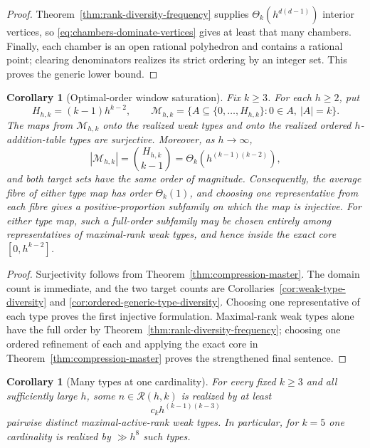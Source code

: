 \documentclass[11pt,reqno]{amsart}
\newtheorem{corollary}[theorem]{Corollary}
\theoremstyle{definition}
\theoremstyle{remark}
\newcommand{\Rcal}{\mathcal R}
\begin{document}
\begin{proof}
Theorem~\ref{thm:rank-diversity-frequency} supplies
$\Theta_k(h^{d(d-1)})$ interior vertices, so
\eqref{eq:chambers-dominate-vertices} gives at least that many chambers.
Finally, each chamber is an open rational polyhedron and contains a
rational point; clearing denominators realizes its strict ordering by an
integer set. This proves the generic lower bound.
\end{proof}

\begin{corollary}[Optimal-order window saturation]
\label{cor:critical-window-saturation}
Fix $k\geq3$.  For each $h\geq2$, put
\[
 H_{h,k}=(k-1)h^{k-2},\qquad
 \mathcal M_{h,k}
 =\{A\subseteq\{0,\ldots,H_{h,k}\}:0\in A,\ |A|=k\}.
\]
The maps from $\mathcal M_{h,k}$ onto the realized weak types and onto the
realized ordered $h$-addition-table types are surjective.  Moreover, as
$h\to\infty$,
\[
 |\mathcal M_{h,k}|=\binom{H_{h,k}}{k-1}
 =\Theta_k\!\left(h^{(k-1)(k-2)}\right),
\]
and both target sets have the same order of magnitude.  Consequently, the
average fibre of either type map has order $\Theta_k(1)$, and choosing one
representative from each fibre gives a positive-proportion subfamily on which
the map is injective.  For either type map, such a full-order subfamily may
be chosen entirely among representatives of maximal-rank weak types, and
hence inside the exact core $[0,h^{k-2}]$.
\end{corollary}

\begin{proof}
Surjectivity follows from Theorem~\ref{thm:compression-master}.  The domain
count is immediate, and the two target counts are
Corollaries~\ref{cor:weak-type-diversity} and
\ref{cor:ordered-generic-type-diversity}.  Choosing one representative of
each type proves the first injective formulation.  Maximal-rank weak types
alone have the full order by Theorem~\ref{thm:rank-diversity-frequency};
choosing one ordered refinement of each and applying the exact core in
Theorem~\ref{thm:compression-master} proves the strengthened final sentence.
\end{proof}

\begin{corollary}[Many types at one cardinality]
\label{cor:many-types-one-cardinality}
For every fixed $k\geq3$ and all sufficiently large $h$, some
$n\in\Rcal(h,k)$ is realized by at least
\[
 c_k h^{(k-1)(k-3)}
\]
pairwise distinct maximal-active-rank weak types.  In particular, for
$k=5$ one cardinality is realized by $\gg h^8$ such types.
\end{corollary}
\end{document}
